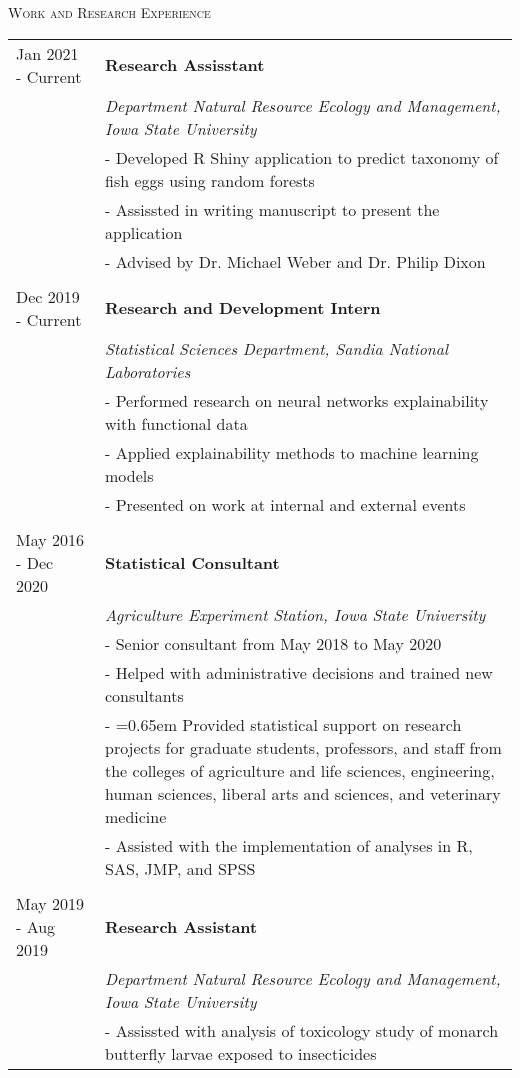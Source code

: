 \documentclass[10pt, oneside]{article}
\begin{document}
\noindent \textsc{Work and Research Experience} \hrulefill
\begin{longtable}{p{3.5cm}p{13cm}}
\hfill{Jan 2021 - Current} & \textbf{Research Assisstant}\\
& \emph{Department Natural Resource Ecology and Management, Iowa State University}\\
& - Developed R Shiny application to predict taxonomy of fish eggs using random forests\\
& - Assissted in writing manuscript to present the application\\
& - Advised by Dr. Michael Weber and Dr. Philip Dixon\\
\\
\hfill{Dec 2019 - Current} & \textbf{Research and Development Intern}\\
& \emph{Statistical Sciences Department, Sandia National Laboratories} \vspace{0.1cm}\\
& - Performed research on neural networks explainability with functional data\\
& - Applied explainability methods to machine learning models\\
& - Presented on work at internal and external events\\
\\
\hfill{May 2016 - Dec 2020} & \textbf{Statistical Consultant}\\
& \emph{Agriculture Experiment Station, Iowa State University} \vspace{0.1cm}\\
& - Senior consultant from May 2018 to May 2020\\
& - Helped with administrative decisions and trained new consultants\\
& - \hangindent=0.65em \hangafter=1 Provided statistical support on research projects for graduate students, professors, and staff from the colleges of agriculture and life sciences, engineering, human sciences, liberal arts and sciences, and veterinary medicine\\
& - Assisted with the implementation of analyses in R, SAS, JMP, and SPSS\\
\\
\hfill{May 2019 - Aug 2019} & \textbf{Research Assistant}\\
& \emph{Department Natural Resource Ecology and Management, Iowa State University}\\
& - Assissted with analysis of toxicology study of monarch butterfly larvae exposed to insecticides\\

\end{longtable}
\end{document}
